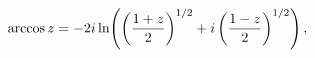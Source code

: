 \[\mathop{\mathrm{arccos}\/}\nolimits z=-2i\mathop{\ln\/}\nolimits\!\left(\left(%
\frac{1+z}{2}\right)^{1/2}+i\left(\frac{1-z}{2}\right)^{1/2}\right),\]